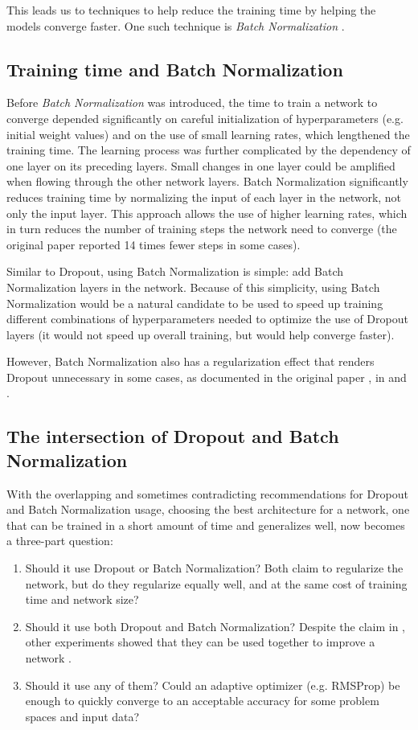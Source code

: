 \documentclass[../CAP6619_term_project_cgarbin.tex]{subfiles}
\begin{document}
This leads us to techniques to help reduce the training time by helping the models converge faster. One such technique is \textit{Batch Normalization} \cite{Ioffe2015}.

\subsection{Training time and Batch Normalization}

Before \textit{Batch Normalization} \cite{Ioffe2015} was introduced, the time to train a network to converge depended significantly on careful initialization of hyperparameters (e.g. initial weight values) and on the use of small learning rates, which lengthened the training time. The learning process was further complicated by the dependency of one layer on its preceding layers. Small changes in one layer could be amplified when flowing through the other network layers. Batch Normalization significantly reduces training time by normalizing the input of each layer in the network, not only the input layer. This approach allows the use of higher learning rates, which in turn reduces the number of training steps the network need to converge (the original paper reported 14 times fewer steps in some cases).

Similar to Dropout, using Batch Normalization is simple: add Batch Normalization layers in the network. Because of this simplicity, using Batch Normalization would be a natural candidate to be used to speed up training different combinations of hyperparameters needed to optimize the use of Dropout layers (it would not speed up overall training, but would help converge faster).

However, Batch Normalization also has a regularization effect that renders Dropout unnecessary in some cases, as documented in the original paper \cite{Ioffe2015}, in \cite{Luo2018} and \cite{Kohler2018}.

\subsection{The intersection of Dropout and Batch Normalization}

With the overlapping and sometimes contradicting recommendations for Dropout and Batch Normalization usage, choosing the best architecture for a network, one that can be trained in a short amount of time and generalizes well, now becomes a three-part question:

\begin{enumerate}
\item Should it use Dropout or Batch Normalization? Both claim to regularize the network, but do they regularize equally well, and at the same cost of training time and network size?
\item Should it use both Dropout and Batch Normalization? Despite the claim in \cite{Ioffe2015}, other experiments showed that they can be used together to improve a network \cite{Li2018}.
\item Should it use any of them? Could an adaptive optimizer (e.g. RMSProp) be enough to quickly converge to an acceptable accuracy for some problem spaces and input data?
\end{enumerate}
\end{document}
